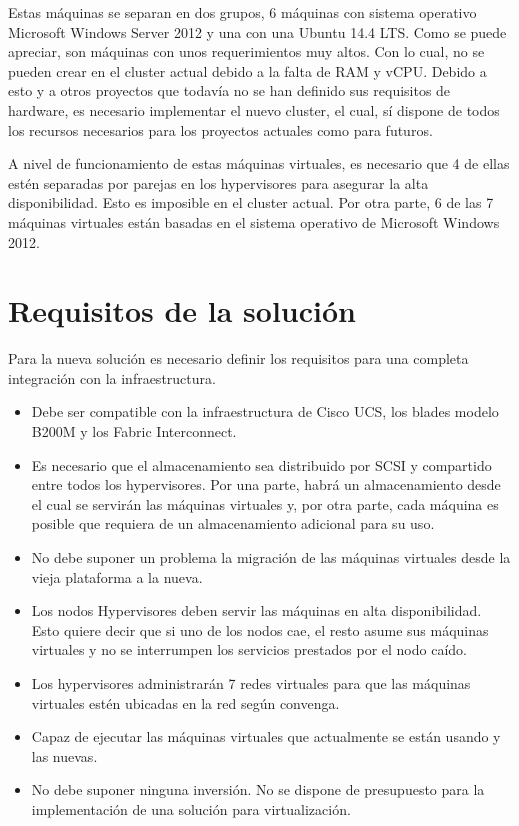 \documentclass[12pt,a4paper,titlepage,twoside]{report}
\begin{document}
Estas máquinas se separan en dos grupos, 6 máquinas con sistema operativo Microsoft Windows Server 2012 y una con una Ubuntu 14.4 LTS.
Como se puede apreciar, son máquinas con unos requerimientos muy altos. Con lo cual, no se pueden crear en el cluster actual debido a la falta de RAM y vCPU. Debido a esto y a otros proyectos que todavía no se han definido sus requisitos de hardware, es necesario implementar el nuevo cluster, el cual, sí dispone de todos los recursos necesarios para los proyectos actuales como para futuros.
\par
A nivel de funcionamiento de estas máquinas virtuales, es necesario que 4 de ellas estén separadas por parejas en los hypervisores para asegurar la alta disponibilidad. Esto es imposible en el cluster actual. Por otra parte, 6 de las 7 máquinas virtuales están basadas en el sistema operativo de Microsoft Windows 2012.
\section{Requisitos de la solución}

Para la nueva solución es necesario definir los requisitos para una completa integración con la infraestructura.
\begin{itemize}
    \item Debe ser compatible con la infraestructura de Cisco UCS, los blades modelo B200M y los Fabric Interconnect.
    \item Es necesario que el almacenamiento sea distribuido por SCSI y compartido entre todos los hypervisores. Por una parte, habrá un almacenamiento desde el cual se servirán las máquinas virtuales y, por otra parte, cada máquina es posible que requiera de un almacenamiento adicional para su uso.
    \item No debe suponer un problema la migración de las máquinas virtuales desde la vieja plataforma a la nueva.
    \item Los nodos Hypervisores deben servir las máquinas en alta disponibilidad. Esto quiere decir que si uno de los nodos cae, el resto asume sus máquinas virtuales y no se interrumpen los servicios prestados por el nodo caído.
    \item Los hypervisores administrarán 7 redes virtuales para que las máquinas virtuales estén ubicadas en la red según convenga.
    \item Capaz de ejecutar las máquinas virtuales que actualmente se están usando y las nuevas.
    \item No debe suponer ninguna inversión. No se dispone de presupuesto para la implementación de una solución para virtualización.
\end{itemize}
\end{document}
